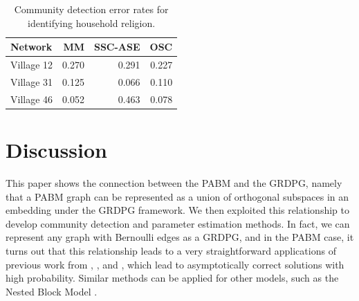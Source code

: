 \documentclass[12pt]{article}
\begin{document}
\begin{table}

\caption{\label{tab:unnamed-chunk-8}Community detection error rates for identifying household religion.}
\centering
\begin{tabular}[t]{l|r|r|r}
\hline
Network & MM & SSC-ASE & OSC\\
\hline
Village 12 & 0.270 & 0.291 & 0.227\\
\hline
Village 31 & 0.125 & 0.066 & 0.110\\
\hline
Village 46 & 0.052 & 0.463 & 0.078\\
\hline
\end{tabular}
\end{table}

\hypertarget{discussion}{%
\section{Discussion}\label{discussion}}

This paper shows the connection between the PABM and the GRDPG, namely
that a PABM graph can be represented as a union of orthogonal subspaces
in an embedding under the GRDPG framework. We then exploited this
relationship to develop community detection and parameter estimation
methods. In fact, we can represent any graph with Bernoulli edges as a
GRDPG, and in the PABM case, it turns out that this relationship leads
to a very straightforward applications of previous work from
\citeauthor{rubindelanchy2017statistical},
\citeauthor{soltanolkotabi2012}, and \citeauthor{jmlr-v28-wang13}, which
lead to asymptotically correct solutions with high probability. Similar
methods can be applied for other models, such as the Nested Block Model
\cite{noroozi2021hierarchy}.

\appendix
\renewcommand\refname{References}
  
\end{document}
